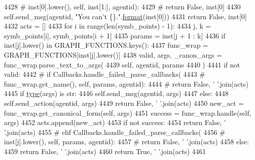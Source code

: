 \begin{DoxyCode}
4428             \textcolor{comment}{#         inst[0].lower(), self, inst[1:], agentid):}
4429             \textcolor{comment}{#     return False, inst[0]}
4430             self.send\_msg(agentid, \textcolor{stringliteral}{"You can't \{\}."}.\hyperlink{namespaceparlai_1_1chat__service_1_1services_1_1messenger_1_1shared__utils_a32e2e2022b824fbaf80c747160b52a76}{format}(inst[0]))
4431             \textcolor{keywordflow}{return} \textcolor{keyword}{False}, inst[0]
4432         acts = []
4433         \textcolor{keywordflow}{for} i \textcolor{keywordflow}{in} range(len(symb\_points) - 1):
4434             j, k = symb\_points[i], symb\_points[i + 1]
4435             params = inst[j + 1 : k]
4436             \textcolor{keywordflow}{if} inst[j].lower() \textcolor{keywordflow}{in} GRAPH\_FUNCTIONS.keys():
4437                 func\_wrap = GRAPH\_FUNCTIONS[inst[j].lower()]
4438                 valid, args, \_canon\_args = func\_wrap.parse\_text\_to\_args(
4439                     self, agentid, params
4440                 )
4441                 \textcolor{keywordflow}{if} \textcolor{keywordflow}{not} valid:
4442                     \textcolor{comment}{# if Callbacks.handle\_failed\_parse\_callbacks(}
4443                     \textcolor{comment}{#         func\_wrap.get\_name(), self, params, agentid):}
4444                     \textcolor{comment}{#     return False, ' '.join(acts)}
4445                     \textcolor{keywordflow}{if} \hyperlink{namespaceparlai_1_1agents_1_1tfidf__retriever_1_1build__tfidf_ad5dfae268e23f506da084a9efb72f619}{type}(args) \textcolor{keywordflow}{is} str:
4446                         self.send\_msg(agentid, args)
4447                     \textcolor{keywordflow}{else}:
4448                         self.send\_action(agentid, args)
4449                     \textcolor{keywordflow}{return} \textcolor{keyword}{False}, \textcolor{stringliteral}{' '}.join(acts)
4450                 new\_act = func\_wrap.get\_canonical\_form(self, args)
4451                 success = func\_wrap.handle(self, args)
4452                 acts.append(new\_act)
4453                 \textcolor{keywordflow}{if} \textcolor{keywordflow}{not} success:
4454                     \textcolor{keywordflow}{return} \textcolor{keyword}{False}, \textcolor{stringliteral}{' '}.join(acts)
4455             \textcolor{comment}{# elif Callbacks.handle\_failed\_parse\_callbacks(}
4456             \textcolor{comment}{#         inst[j].lower(), self, params, agentid):}
4457             \textcolor{comment}{#     return False, ' '.join(acts)}
4458             \textcolor{keywordflow}{else}:
4459                 \textcolor{keywordflow}{return} \textcolor{keyword}{False}, \textcolor{stringliteral}{' '}.join(acts)
4460         \textcolor{keywordflow}{return} \textcolor{keyword}{True}, \textcolor{stringliteral}{' '}.join(acts)
4461 
\end{DoxyCode}
\mbox{\label{classlight__chats_1_1graph_1_1Graph_a6eaae6c0b9fbcaf9f478a790ff356671}} 
